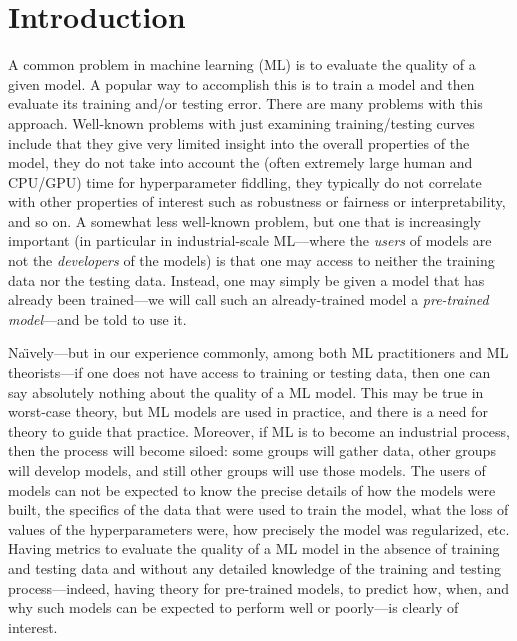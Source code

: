 
\section{Introduction}
\label{sxn:intro}

A common problem in machine learning (ML) 
is to evaluate the quality of a given model.
A popular way to accomplish this
is to train a model and then evaluate its training and/or testing error.
There are many problems with this approach.
Well-known problems with just examining training/testing curves include that 
they give very limited insight into the overall properties of the model, 
they do not take into account the (often extremely large human and CPU/GPU) time for hyperparameter fiddling,
they typically do not correlate with other properties of interest such as robustness or fairness or interpretability, 
and so on.
A somewhat less well-known problem, but one that is increasingly important (in particular in industrial-scale ML---where the \emph{users} of models are not the \emph{developers} of the models) is that one may access to neither the training data nor the testing data.
Instead, one may simply be given a model that has already been trained---we will call such an already-trained model a \emph{pre-trained model}---and be told to use it.

Na\"{\i}vely---but in our experience commonly, among both ML practitioners and ML theorists---if one does not have access to training or testing data, then one can say absolutely nothing about the quality of a ML model.
This may be true in worst-case theory, but ML models are used in practice, and there is a need for theory to guide that practice.
Moreover, if ML is to become an industrial process, then the process will become siloed: some groups will gather data, other groups will develop models, and still other groups will use those models.
The users of models can not be expected to know the precise details of how the models were built, the specifics of the data that were used to train the model, what the loss of values of the hyperparameters were, how precisely the model was regularized, etc.
%
Having metrics to evaluate the quality of a ML model in the absence of training and testing data and without any detailed knowledge of the training and testing process---indeed, having theory for pre-trained models, to predict how, when, and why such models can be expected to perform well or poorly---is clearly of interest.

